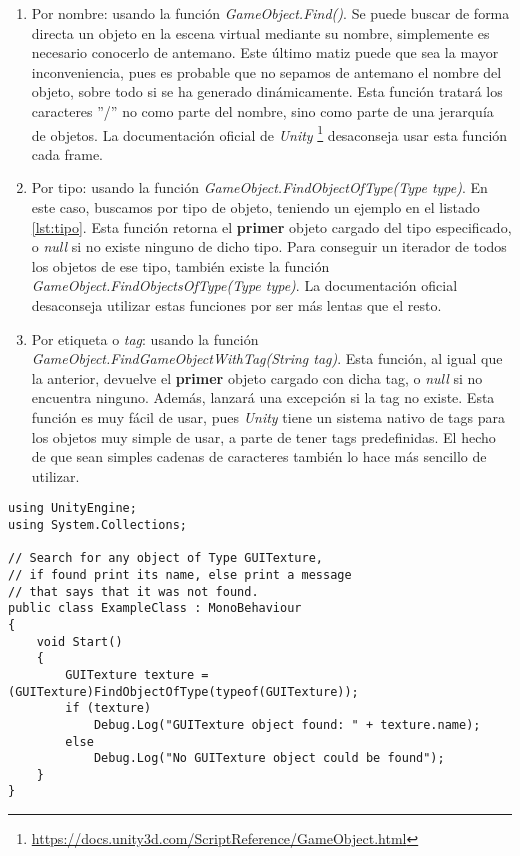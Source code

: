 \documentclass{pre-tfg}
\begin{document}
\begin{enumerate}
\item Por nombre: usando la función \textit{GameObject.Find()}. Se puede buscar de forma directa un objeto en la escena virtual mediante su nombre, simplemente es necesario conocerlo de antemano. Este último matiz puede que sea la mayor inconveniencia, pues es probable que no sepamos de antemano el nombre del objeto, sobre todo si se ha generado dinámicamente. Esta función tratará los caracteres ''/'' no como parte del nombre, sino como parte de una jerarquía de objetos. La documentación oficial de \textit{Unity} \footnote{\url{https://docs.unity3d.com/ScriptReference/GameObject.html}} \cite{unityreference} desaconseja usar esta función cada frame.
\item Por tipo: usando la función \textit{GameObject.FindObjectOfType(Type type)}. En este caso, buscamos por tipo de objeto, teniendo un ejemplo en el listado \ref{lst:tipo}.
 Esta función retorna el \textbf{primer} objeto cargado del tipo especificado, o \textit{null} si no existe ninguno de dicho tipo. Para conseguir un iterador de todos los objetos de ese tipo, también existe la función \textit{GameObject.FindObjectsOfType(Type type)}. La documentación oficial desaconseja utilizar estas funciones por ser más lentas que el resto.
\item Por etiqueta o \textit{tag}: usando la función \textit{GameObject.FindGameObjectWithTag(String tag)}. Esta función, al igual que la anterior, devuelve el \textbf{primer} objeto cargado con dicha tag, o \textit{null} si no encuentra ninguno. Además, lanzará una excepción si la tag no existe. Esta función es muy fácil de usar, pues \textit{Unity} tiene un sistema nativo de tags para los objetos muy simple de usar, a parte de tener tags predefinidas. El hecho de que sean simples cadenas de caracteres también lo hace más sencillo de utilizar. 
\end{enumerate}

\begin{spacing}{1}
\begin{lstlisting}[float=htbp, caption=Búsqueda de objetos por tipo, label=lst:tipo]
using UnityEngine;
using System.Collections;

// Search for any object of Type GUITexture,
// if found print its name, else print a message
// that says that it was not found.
public class ExampleClass : MonoBehaviour
{
    void Start()
    {
        GUITexture texture = (GUITexture)FindObjectOfType(typeof(GUITexture));
        if (texture)
            Debug.Log("GUITexture object found: " + texture.name);
        else
            Debug.Log("No GUITexture object could be found");
    }
}
\end{lstlisting}
\end{spacing}
\end{document}
